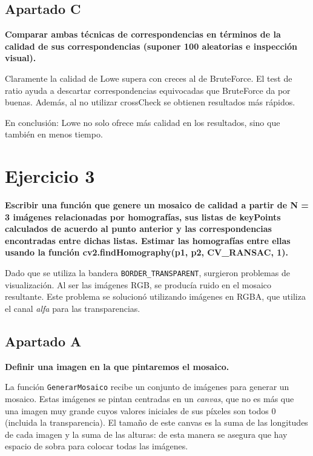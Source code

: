 \documentclass[12pt,spanish]{article} %
\begin{document}
\subsection{Apartado C}

\textbf{
Comparar ambas técnicas de correspondencias en términos de la calidad de sus correspondencias (suponer 100 aleatorias e inspección visual).
}

Claramente la calidad de Lowe supera con creces al de BruteForce. El test de ratio ayuda a descartar correspondencias equivocadas que BruteForce da por buenas. Además, al no utilizar crossCheck se obtienen resultados más rápidos.

En conclusión: Lowe no solo ofrece más calidad en los resultados, sino que también en menos tiempo.


\section{Ejercicio 3}

\textbf{Escribir una función que genere un mosaico de calidad a partir de N = 3 imágenes relacionadas por homografías, sus listas de keyPoints calculados de acuerdo al punto anterior y las correspondencias encontradas entre dichas listas. Estimar las homografías entre ellas usando la función cv2.findHomography(p1, p2, CV\_RANSAC, 1).}

Dado que se utiliza la bandera \texttt{BORDER\_TRANSPARENT}, surgieron problemas de visualización. Al ser las imágenes RGB, se producía ruido en el mosaico resultante. Este problema se solucionó utilizando imágenes en RGBA, que utiliza el canal \textit{alfa} para las transparencias.

\subsection{Apartado A}

\textbf{
Definir una imagen en la que pintaremos el mosaico.
}

La función \texttt{GenerarMosaico} recibe un conjunto de imágenes para generar un mosaico. Estas imágenes se pintan centradas en un \textit{canvas}, que no es más que una imagen muy grande cuyos valores iniciales de sus píxeles son todos 0 (incluida la transparencia). El tamaño de este canvas es la suma de las longitudes de cada imagen y la suma de las alturas: de esta manera se asegura que hay espacio de sobra para colocar todas las imágenes.
\end{document}
